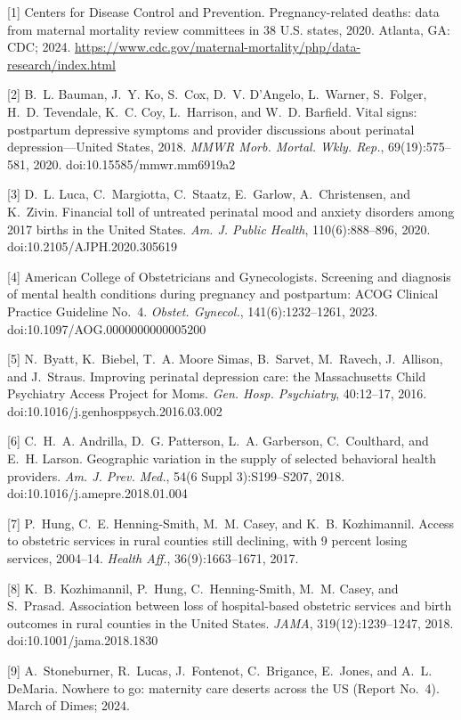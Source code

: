 \documentclass{article}
\begin{document}
[1] Centers for Disease Control and Prevention. Pregnancy-related deaths: data from maternal mortality review committees in 38 U.S. states, 2020. Atlanta, GA: CDC; 2024. \url{https://www.cdc.gov/maternal-mortality/php/data-research/index.html}

[2] B.~L. Bauman, J.~Y. Ko, S.~Cox, D.~V. D'Angelo, L.~Warner, S.~Folger, H.~D. Tevendale, K.~C. Coy, L.~Harrison, and W.~D. Barfield. Vital signs: postpartum depressive symptoms and provider discussions about perinatal depression---United States, 2018. \emph{MMWR Morb. Mortal. Wkly. Rep.}, 69(19):575--581, 2020. doi:10.15585/mmwr.mm6919a2

[3] D.~L. Luca, C.~Margiotta, C.~Staatz, E.~Garlow, A.~Christensen, and K.~Zivin. Financial toll of untreated perinatal mood and anxiety disorders among 2017 births in the United States. \emph{Am. J. Public Health}, 110(6):888--896, 2020. doi:10.2105/AJPH.2020.305619

[4] American College of Obstetricians and Gynecologists. Screening and diagnosis of mental health conditions during pregnancy and postpartum: ACOG Clinical Practice Guideline No.~4. \emph{Obstet. Gynecol.}, 141(6):1232--1261, 2023. doi:10.1097/AOG.0000000000005200

[5] N.~Byatt, K.~Biebel, T.~A. Moore Simas, B.~Sarvet, M.~Ravech, J.~Allison, and J.~Straus. Improving perinatal depression care: the Massachusetts Child Psychiatry Access Project for Moms. \emph{Gen. Hosp. Psychiatry}, 40:12--17, 2016. doi:10.1016/j.genhosppsych.2016.03.002

[6] C.~H.~A. Andrilla, D.~G. Patterson, L.~A. Garberson, C.~Coulthard, and E.~H. Larson. Geographic variation in the supply of selected behavioral health providers. \emph{Am. J. Prev. Med.}, 54(6 Suppl 3):S199--S207, 2018. doi:10.1016/j.amepre.2018.01.004

[7] P.~Hung, C.~E. Henning-Smith, M.~M. Casey, and K.~B. Kozhimannil. Access to obstetric services in rural counties still declining, with 9 percent losing services, 2004--14. \emph{Health Aff.}, 36(9):1663--1671, 2017.

[8] K.~B. Kozhimannil, P.~Hung, C.~Henning-Smith, M.~M. Casey, and S.~Prasad. Association between loss of hospital-based obstetric services and birth outcomes in rural counties in the United States. \emph{JAMA}, 319(12):1239--1247, 2018. doi:10.1001/jama.2018.1830

[9] A.~Stoneburner, R.~Lucas, J.~Fontenot, C.~Brigance, E.~Jones, and A.~L. DeMaria. Nowhere to go: maternity care deserts across the US (Report No.~4). March of Dimes; 2024.
\end{document}
